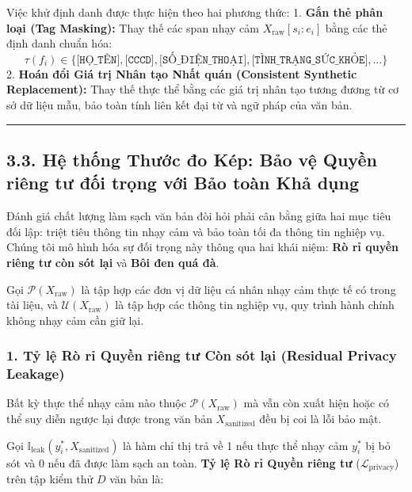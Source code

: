 \documentclass[
  11pt,
  a4paper,
]{article}
\begin{document}
Việc khử định danh được thực hiện theo hai phương thức: 1. \textbf{Gắn thẻ phân loại (Tag Masking):}
Thay thế các span nhạy cảm \(X_{\text{raw}}[s_i:e_i]\) bằng các thẻ định danh chuẩn hóa:
\[\tau(f_i) \in \bigl\{\texttt{[HỌ\_TÊN]}, \texttt{[CCCD]}, \texttt{[SỐ\_ĐIỆN\_THOẠI]}, \texttt{[TÌNH\_TRẠNG\_SỨC\_KHỎE]}, \dots\bigr\}\]
2. \textbf{Hoán đổi Giá trị Nhân tạo Nhất quán (Consistent Synthetic Replacement):} Thay thế thực
thể bằng các giá trị nhân tạo tương đương từ cơ sở dữ liệu mẫu, bảo toàn tính liên kết đại từ và ngữ
pháp của văn bản.

\begin{center}\rule{0.5\linewidth}{0.5pt}\end{center}

\subsection{3.3. Hệ thống Thước đo Kép: Bảo vệ Quyền riêng tư đối trọng với Bảo toàn Khả
dụng}\label{hux1ec7-thux1ed1ng-thux1b0ux1edbc-ux111o-kuxe9p-bux1ea3o-vux1ec7-quyux1ec1n-riuxeang-tux1b0-ux111ux1ed1i-trux1ecdng-vux1edbi-bux1ea3o-touxe0n-khux1ea3-dux1ee5ng}

Đánh giá chất lượng làm sạch văn bản đòi hỏi phải cân bằng giữa hai mục tiêu đối lập: triệt tiêu
thông tin nhạy cảm và bảo toàn tối đa thông tin nghiệp vụ. Chúng tôi mô hình hóa sự đối trọng này
thông qua hai khái niệm: \textbf{Rò rỉ quyền riêng tư còn sót lại} và \textbf{Bôi đen quá đà}.

Gọi \(\mathcal{P}(X_{\text{raw}})\) là tập hợp các đơn vị dữ liệu cá nhân nhạy cảm thực tế có trong
tài liệu, và \(\mathcal{U}(X_{\text{raw}})\) là tập hợp các thông tin nghiệp vụ, quy trình hành
chính không nhạy cảm cần giữ lại.

\subsubsection{1. Tỷ lệ Rò rỉ Quyền riêng tư Còn sót lại (Residual Privacy
Leakage)}\label{tux1ef7-lux1ec7-ruxf2-rux1ec9-quyux1ec1n-riuxeang-tux1b0-cuxf2n-suxf3t-lux1ea1i-residual-privacy-leakage}

Bất kỳ thực thể nhạy cảm nào thuộc \(\mathcal{P}(X_{\text{raw}})\) mà vẫn còn xuất hiện hoặc có thể
suy diễn ngược lại được trong văn bản \(X_{\text{sanitized}}\) đều bị coi là lỗi bảo mật.

Gọi \(\mathbb{I}_{\text{leak}}(y_i^*, X_{\text{sanitized}})\) là hàm chỉ thị trả về 1 nếu thực thể
nhạy cảm \(y_i^*\) bị bỏ sót và 0 nếu đã được làm sạch an toàn. \textbf{Tỷ lệ Rò rỉ Quyền riêng tư}
(\(\mathcal{L}_{\text{privacy}}\)) trên tập kiểm thử \(D\) văn bản là:
\end{document}
